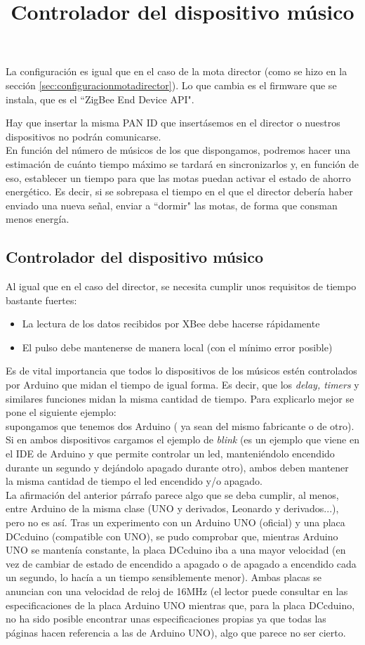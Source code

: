 La configuración es igual que en el caso de la mota director (como se hizo en la sección
\ref{sec:configuracionmotadirector}). Lo que cambia es el firmware que se instala, que es el
``ZigBee End Device API".

Hay que insertar la misma PAN ID que insertásemos en el director o nuestros dispositivos
no podrán comunicarse.\\

En función del número de músicos de los que dispongamos, podremos hacer una estimación de
cuánto tiempo máximo se tardará en sincronizarlos y, en función de eso,
establecer un tiempo para que las motas puedan activar el estado de ahorro energético.
Es decir, si se sobrepasa el tiempo en el que el director debería haber enviado una
nueva señal, enviar a ``dormir" las motas, de forma que consman menos energía.


\subsection{Controlador del dispositivo músico}
\title{Controlador del dispositivo músico}
Al igual que en el caso del director, se necesita cumplir unos requisitos de tiempo
bastante fuertes:
\begin{itemize}
  \item La lectura de los datos recibidos por XBee debe hacerse rápidamente
  \item El pulso debe mantenerse de manera local (con el mínimo error posible)
\end{itemize}

Es de vital importancia que todos lo dispositivos de los músicos estén controlados
por Arduino que midan el tiempo de igual forma. Es decir, que los \textit{delay,
timers} y similares funciones midan la misma cantidad de tiempo. Para explicarlo
mejor se pone el siguiente ejemplo:\\
supongamos que tenemos dos Arduino ( ya sean del mismo fabricante o de otro). Si en ambos dispositivos
cargamos el ejemplo de \textit{blink} \cite{arduinoBlink} (es un ejemplo que viene
en el IDE de Arduino y que permite controlar un led, manteniéndolo encendido durante un segundo
y dejándolo apagado durante otro), ambos deben mantener la misma cantidad de tiempo
el led encendido y/o apagado.\\

La afirmación del anterior párrafo parece algo que se deba cumplir, al menos, entre
Arduino de la misma clase (UNO y derivados, Leonardo y derivados...), pero no es así.
Tras un experimento con un Arduino UNO (oficial) y una placa DCcduino (compatible con UNO),
se pudo comprobar que, mientras Arduino UNO se mantenía constante, la placa DCcduino iba a una
mayor velocidad (en vez de cambiar de estado de encendido a apagado o de apagado a encendido
cada un segundo, lo hacía a un tiempo sensiblemente menor). Ambas placas se anuncian
con una velocidad de reloj de 16MHz (el lector puede consultar en \cite{arduinoUNO} las
especificaciones de la placa Arduino UNO mientras que, para la placa DCcduino, no ha sido
posible encontrar unas especificaciones propias ya que todas las páginas hacen referencia
a las de Arduino UNO), algo que parece no ser cierto.\\

